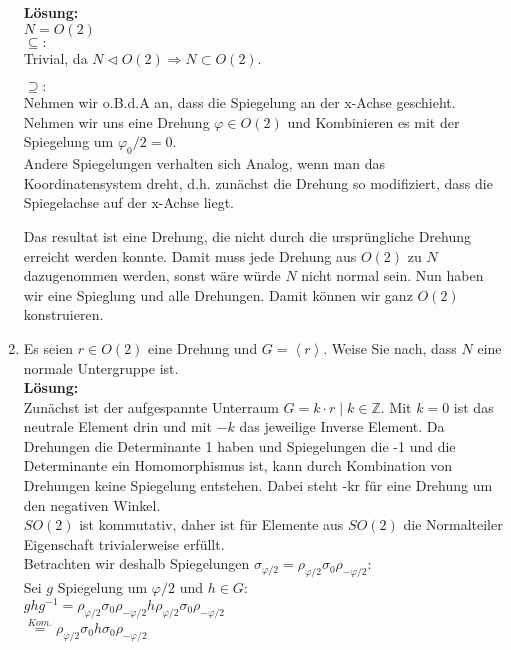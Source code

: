 \documentclass[11pt,a4paper,ngerman]{article}
\begin{document}
\begin{enumerate}[\bfseries a)]
\textbf{Lösung:}\\
$N = O(2)$\\

$\subseteq:$\\
Trivial, da $N \vartriangleleft O(2) \Rightarrow N \subset O(2)$.

$\supseteq:$\\
Nehmen wir o.B.d.A an, dass die Spiegelung an der x-Achse geschieht.\\
Nehmen wir uns eine Drehung $\varphi \in O(2)$ und Kombinieren es mit der Spiegelung um $\varphi_0 / 2 = 0$.\\
Andere Spiegelungen verhalten sich Analog, wenn man das Koordinatensystem dreht, d.h. zunächst die Drehung so modifiziert, dass die Spiegelachse auf der x-Achse liegt.

Das resultat ist eine Drehung, die nicht durch die ursprüngliche Drehung erreicht werden konnte. Damit muss jede Drehung aus $O(2)$ zu $N$ dazugenommen werden, sonst wäre würde $N$ nicht normal sein. Nun haben wir eine Spieglung und alle Drehungen. Damit können wir ganz $O(2)$ konstruieren.

\pagebreak

\item Es seien $r \in O(2)$ eine Drehung und $G = \left< r \right>$. Weise Sie nach, dass $N$ eine normale Untergruppe ist.\\

\textbf{Lösung:}\\

Zunächst ist der aufgespannte Unterraum $G = {k \cdot r \; | \; k \in \mathbb{Z}}$. Mit $k=0$ ist das neutrale Element drin und mit $-k$ das jeweilige Inverse Element. Da Drehungen die Determinante 1 haben und Spiegelungen die -1 und die Determinante ein Homomorphismus ist, kann durch Kombination von Drehungen keine Spiegelung entstehen. Dabei steht -kr für eine Drehung um den negativen Winkel.\\

$SO(2)$ ist kommutativ, daher ist für Elemente aus $SO(2)$ die Normalteiler Eigenschaft trivialerweise erfüllt.\\

Betrachten wir deshalb Spiegelungen $\sigma_{\varphi / 2} = \rho_{\varphi / 2} \sigma_0 \rho_{- \varphi / 2}$:\\

Sei $g$ Spiegelung um $\varphi / 2$ und $h \in G$:\\
$ghg^{-1} = \rho_{\varphi / 2} \sigma_0 \rho_{- \varphi / 2} h \rho_{\varphi / 2} \sigma_0 \rho_{-\varphi / 2}$\\
$\stackrel{Kom.}{=}\rho_{\varphi / 2} \sigma_0 h \sigma_0 \rho_{-\varphi / 2}$\\


\end{enumerate}
\end{document}
